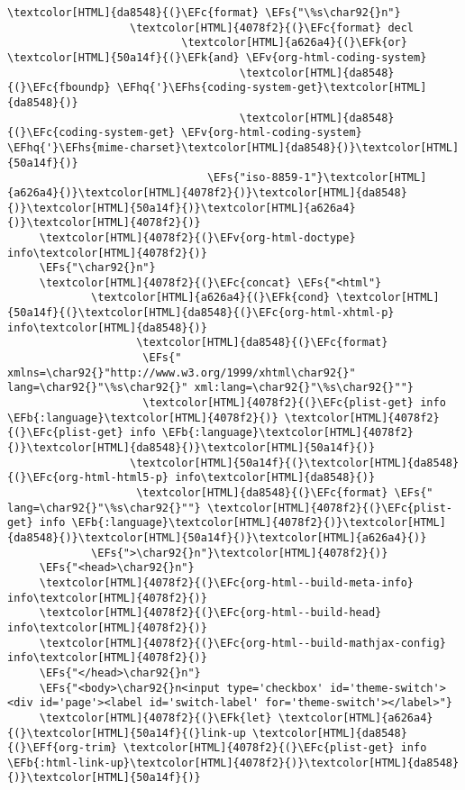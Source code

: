 \documentclass{scrartcl}
\newcommand{\EFk}[1]{\textcolor{EFk}{#1}} %
\newcommand{\EFs}[1]{\textcolor{EFs}{#1}} %
\newcommand{\EFb}[1]{\textcolor{EFb}{#1}} %
\newcommand{\EFc}[1]{\textcolor{EFc}{#1}} %
\newcommand{\EFv}[1]{\textcolor{EFv}{#1}} %
\newcommand{\EFf}[1]{\textcolor{EFf}{#1}} %
\newcommand{\EFhq}[1]{\textcolor{EFhq}{#1}} %
\newcommand{\EFhs}[1]{\textcolor{EFhs}{#1}} %
\begin{document}
\begin{Code}
\begin{Verbatim}[]
           \textcolor[HTML]{da8548}{(}\EFc{format} \EFs{"\%s\char92{}n"}
                   \textcolor[HTML]{4078f2}{(}\EFc{format} decl
                           \textcolor[HTML]{a626a4}{(}\EFk{or} \textcolor[HTML]{50a14f}{(}\EFk{and} \EFv{org-html-coding-system}
                                    \textcolor[HTML]{da8548}{(}\EFc{fboundp} \EFhq{'}\EFhs{coding-system-get}\textcolor[HTML]{da8548}{)}
                                    \textcolor[HTML]{da8548}{(}\EFc{coding-system-get} \EFv{org-html-coding-system} \EFhq{'}\EFhs{mime-charset}\textcolor[HTML]{da8548}{)}\textcolor[HTML]{50a14f}{)}
                               \EFs{"iso-8859-1"}\textcolor[HTML]{a626a4}{)}\textcolor[HTML]{4078f2}{)}\textcolor[HTML]{da8548}{)}\textcolor[HTML]{50a14f}{)}\textcolor[HTML]{a626a4}{)}\textcolor[HTML]{4078f2}{)}
     \textcolor[HTML]{4078f2}{(}\EFv{org-html-doctype} info\textcolor[HTML]{4078f2}{)}
     \EFs{"\char92{}n"}
     \textcolor[HTML]{4078f2}{(}\EFc{concat} \EFs{"<html"}
             \textcolor[HTML]{a626a4}{(}\EFk{cond} \textcolor[HTML]{50a14f}{(}\textcolor[HTML]{da8548}{(}\EFc{org-html-xhtml-p} info\textcolor[HTML]{da8548}{)}
                    \textcolor[HTML]{da8548}{(}\EFc{format}
                     \EFs{" xmlns=\char92{}"http://www.w3.org/1999/xhtml\char92{}" lang=\char92{}"\%s\char92{}" xml:lang=\char92{}"\%s\char92{}""}
                     \textcolor[HTML]{4078f2}{(}\EFc{plist-get} info \EFb{:language}\textcolor[HTML]{4078f2}{)} \textcolor[HTML]{4078f2}{(}\EFc{plist-get} info \EFb{:language}\textcolor[HTML]{4078f2}{)}\textcolor[HTML]{da8548}{)}\textcolor[HTML]{50a14f}{)}
                   \textcolor[HTML]{50a14f}{(}\textcolor[HTML]{da8548}{(}\EFc{org-html-html5-p} info\textcolor[HTML]{da8548}{)}
                    \textcolor[HTML]{da8548}{(}\EFc{format} \EFs{" lang=\char92{}"\%s\char92{}""} \textcolor[HTML]{4078f2}{(}\EFc{plist-get} info \EFb{:language}\textcolor[HTML]{4078f2}{)}\textcolor[HTML]{da8548}{)}\textcolor[HTML]{50a14f}{)}\textcolor[HTML]{a626a4}{)}
             \EFs{">\char92{}n"}\textcolor[HTML]{4078f2}{)}
     \EFs{"<head>\char92{}n"}
     \textcolor[HTML]{4078f2}{(}\EFc{org-html--build-meta-info} info\textcolor[HTML]{4078f2}{)}
     \textcolor[HTML]{4078f2}{(}\EFc{org-html--build-head} info\textcolor[HTML]{4078f2}{)}
     \textcolor[HTML]{4078f2}{(}\EFc{org-html--build-mathjax-config} info\textcolor[HTML]{4078f2}{)}
     \EFs{"</head>\char92{}n"}
     \EFs{"<body>\char92{}n<input type='checkbox' id='theme-switch'><div id='page'><label id='switch-label' for='theme-switch'></label>"}
     \textcolor[HTML]{4078f2}{(}\EFk{let} \textcolor[HTML]{a626a4}{(}\textcolor[HTML]{50a14f}{(}link-up \textcolor[HTML]{da8548}{(}\EFf{org-trim} \textcolor[HTML]{4078f2}{(}\EFc{plist-get} info \EFb{:html-link-up}\textcolor[HTML]{4078f2}{)}\textcolor[HTML]{da8548}{)}\textcolor[HTML]{50a14f}{)}

\end{Verbatim}
\end{Code}
\end{document}

